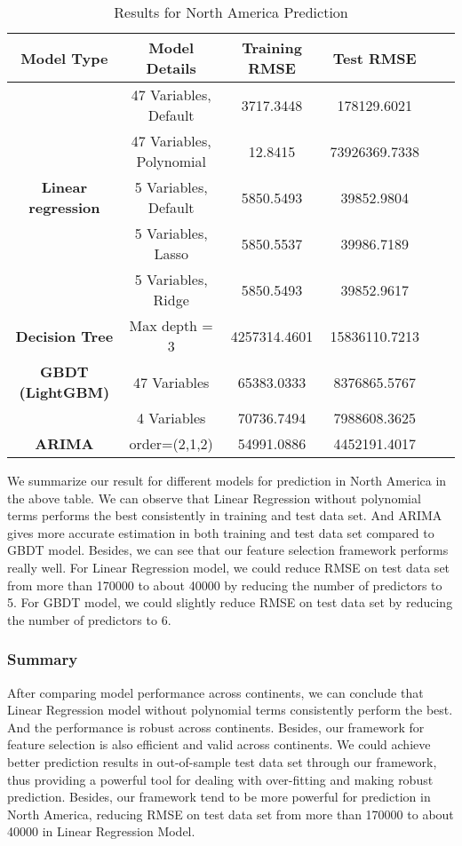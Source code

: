 \documentclass{article}
\begin{document}
\begin{table}[H]
        \centering
        \caption{Results for North America Prediction}\label{tab:results}
        \begin{tabular}{c c c c c c}
            \toprule
            Model Type & Model Details & Training RMSE & Test RMSE\\
            \hline
            & 47 Variables, Default & 3717.3448 & 178129.6021 \\
            & 47 Variables, Polynomial & 12.8415 & 73926369.7338 \\
            \textbf{Linear regression}& 5 Variables, Default & 5850.5493 & 39852.9804 \\
            & 5 Variables, Lasso & 5850.5537 & 39986.7189 \\
            & 5 Variables, Ridge & 5850.5493 &  39852.9617 \\
            \hline
            \textbf{Decision Tree}& Max depth = 3 & 4257314.4601 & 15836110.7213  \\
            \hline
            \textbf{GBDT (LightGBM)}& 47 Variables & 65383.0333 & 8376865.5767 \\
            & 4 Variables & 70736.7494 & 7988608.3625 \\
            \hline
            \textbf{ARIMA}& order=(2,1,2)  & 54991.0886 & 4452191.4017 \\
            \bottomrule
        \end{tabular}
\end{table}

\noindent We summarize our result for different models for prediction in North America in the above table. We can observe that Linear Regression without polynomial terms performs the best consistently in training and test data set. And ARIMA gives more accurate estimation in both training and test data set compared to GBDT model. Besides, we can see that our feature selection framework performs really well. For Linear Regression model, we could reduce RMSE on test data set from more than 170000 to about 40000 by reducing the number of predictors to 5. For GBDT model,  we could slightly reduce RMSE on test data set by reducing the number of predictors to 6. \\

\subsubsection{Summary}

After comparing model performance across continents, we can conclude that Linear Regression model without polynomial terms consistently perform the best. And the performance is robust across continents. Besides, our framework for feature selection is also efficient and valid across continents. We could achieve better prediction results in out-of-sample test data set through our framework, thus providing a powerful tool for dealing with over-fitting and making robust prediction. Besides, our framework tend to be more powerful for prediction in North America, reducing RMSE on test data set from more than 170000 to about 40000 in Linear Regression Model. \\
\end{document}
